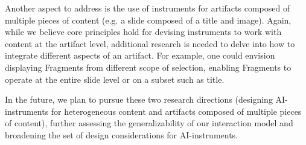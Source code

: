 Another aspect to address is the use of instruments for artifacts composed of multiple pieces of content (e.g. a slide composed of a title and image). Again, while we believe core principles hold for devising instruments to work with content at the artifact level, additional research is needed to delve into how to integrate different aspects of an artifact. For example, one could envision displaying Fragments from different scope of selection, enabling Fragments to operate at the entire slide level or on a subset such as title.



In the future, we plan to pursue these two research directions (designing AI-instruments for heterogeneous content and artifacts composed of multiple pieces of content), further assessing the generalizability of our interaction model and broadening the set of design considerations for AI-instruments.














